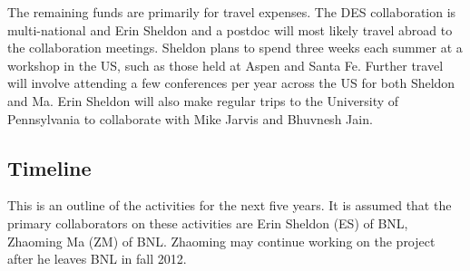 \documentclass[12pt]{article}
\begin{document}
The remaining funds are primarily for travel expenses.   The DES collaboration
is multi-national and Erin Sheldon and a postdoc will most likely travel abroad
to the collaboration meetings.  Sheldon plans to spend three weeks each summer
at a workshop in the US, such as those held at Aspen and Santa Fe.  Further
travel will involve attending a few conferences per year across the US for both
Sheldon and Ma.  Erin Sheldon will also make regular trips to the University of
Pennsylvania to collaborate with Mike Jarvis and Bhuvnesh Jain.

\clearpage
\newpage
\subsection{Timeline}

This is an outline of the activities for the next five years.  It is assumed
that the primary collaborators on these activities are Erin Sheldon (ES) of
BNL, Zhaoming Ma (ZM) of BNL.  Zhaoming may continue working on the project
after he leaves BNL in fall 2012.
\end{document}

